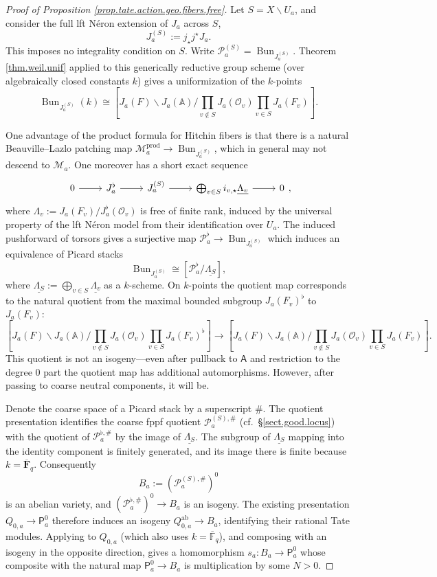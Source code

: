 \documentclass[openany]{amsbook}
\theoremstyle{definition}
\theoremstyle{remark}
\numberwithin{equation}{section}
\renewcommand{\O}{\mathcal{O}}
\newcommand{\cM}{\mathcal{M}}
\newcommand{\cP}{\mathcal{P}}
\newcommand{\A}{\mathbb{A}}
\newcommand{\ol}[1]{\overline{#1}}
\newcommand{\ul}[1]{\underline{#1}}
\renewcommand{\-}{\operatorname{-}}
\newcommand{\on}[1]{\operatorname{#1}}
\renewcommand{\A}{\mathbb{A}}
\newcommand{\bA}{\mathsf{A}}
\newcommand{\bP}{\mathsf{P}}
\newcommand{\ab}{\mathrm{ab}}
\newcommand{\Bun}{\on{Bun}}
\begin{document}
\begin{proof}[Proof of Proposition \ref{prop.tate.action.geo.fibers.free}]

Let $S = X \backslash U_a$, and consider the full lft N\'eron extension of $J_a$ across $S$,
$$
    J_a^{(S)} := j_\star j^\star J_a.
$$
This imposes no integrality condition on $S$. Write $\mathcal P_a^{(S)}=\Bun_{J_a^{(S)}}$. Theorem \ref{thm.weil.unif} applied to this generically reductive group scheme (over algebraically closed constants $k$) gives a uniformization of the $k$-points
$$
    \Bun_{J_a^{(S)}}(k) \cong [J_a(F) \backslash J_a(\A) / \prod_{v \not\in S} J_a(\O_v) \prod_{v \in S} J_a(F_v)].
$$

One advantage of the product formula for Hitchin fibers is that there is a natural Beauville--Lazlo patching map $\cM_a^{\on{prod}} \to \Bun_{J_a^{(S)}}$, which in general may not descend to $\cM_a$. One moreover has a short exact sequence 
$$
\begin{tikzcd} 0 \ar[r] & J_a^{\flat} \ar[r] & J_a^{(S)} \ar[r] & \bigoplus_{v \in S} i_{v,\star} \ul{\Lambda_v} \ar[r] & 0
\end{tikzcd},
$$
where $\Lambda_v := J_a(F_v)/J_a^{\flat}(\O_v)$ is free of finite rank, induced by the universal property of the lft N\'eron model from their identification over $U_a$. The induced pushforward of torsors gives a surjective map $\cP_a^{\flat} \to \Bun_{J_a^{(S)}}$ which induces an equivalence of Picard stacks
$$
    \Bun_{J_a^{(S)}} \cong \left[\cP_a^{\flat}/\ul{\Lambda_S}\right],
$$
where $\ul{\Lambda_S} := \bigoplus_{v \in S} \ul{\Lambda_v}$ as a $k$-scheme. On $k$-points the quotient map corresponds to the natural quotient from the maximal bounded subgroup $J_a(F_v)^{\flat}$ to $J_a(F_v)$:
$$
[J_a(F) \backslash J_a(\A) / \prod_{v \not\in S} J_a(\O_v) \prod_{v \in S} J_a(F_v)^{\flat}] \to [J_a(F) \backslash J_a(\A) / \prod_{v \not\in S} J_a(\O_v) \prod_{v \in S} J_a(F_v)].
$$
This quotient is not an isogeny---even after pullback to $\bA$ and restriction to the degree 0 part the quotient map has additional automorphisms. However, after passing to coarse neutral components, it will be.

Denote the coarse space of a Picard stack by a superscript $\#$. The quotient presentation identifies the coarse fppf quotient $\mathcal P_a^{(S),\#}$ (cf.\ \S \ref{sect.good.locus}) with the quotient of $\mathcal P_a^{\flat,\#}$ by the image of $\ul{\Lambda_S}$. The subgroup of $\ul{\Lambda_S}$ mapping into the identity component is finitely generated, and its image there is finite because $k=\overline{\mathbf F}_q$. Consequently
\[
B_a:=(\mathcal P_a^{(S),\#})^0
\]
is an abelian variety, and $(\mathcal P_a^{\flat,\#})^0\to B_a$ is an isogeny. The existing presentation $Q_{0,a}\to\bP_a^0$ therefore induces an isogeny $Q_{0,a}^{\ab}\to B_a$, identifying their rational Tate modules. Applying \cite[Proposition 7.5.3]{ngofl} to $Q_{0,a}$ (which also uses $k = \ol{\mathbb{F}}_q$), and composing with an isogeny in the opposite direction, gives a homomorphism $s_a:B_a\to \bP_a^0$ whose composite with the natural map $\bP_a^0\to B_a$ is multiplication by some $N>0$.


\end{proof}
\end{document}
